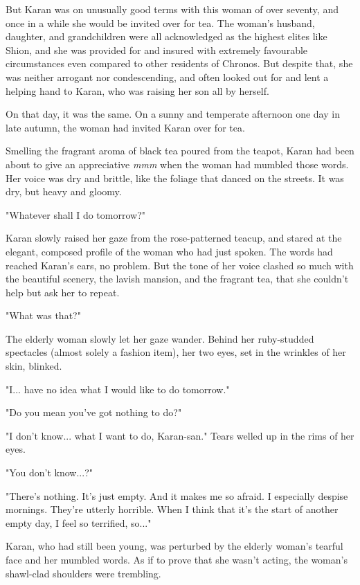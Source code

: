But Karan was on unusually good terms with this woman of over seventy,
and once in a while she would be invited over for tea. The woman's
husband, daughter, and grandchildren were all acknowledged as the
highest elites like Shion, and she was provided for and insured with
extremely favourable circumstances even compared to other residents of
Chronos. But despite that, she was neither arrogant nor condescending,
and often looked out for and lent a helping hand to Karan, who was
raising her son all by herself.

On that day, it was the same. On a sunny and temperate afternoon one day
in late autumn, the woman had invited Karan over for tea.

Smelling the fragrant aroma of black tea poured from the teapot, Karan
had been about to give an appreciative \emph{mmm} when the woman had mumbled
those words. Her voice was dry and brittle, like the foliage that danced
on the streets. It was dry, but heavy and gloomy.

"Whatever shall I do tomorrow?"

Karan slowly raised her gaze from the rose-patterned teacup, and stared
at the elegant, composed profile of the woman who had just spoken. The
words had reached Karan's ears, no problem. But the tone of her voice
clashed so much with the beautiful scenery, the lavish mansion, and the
fragrant tea, that she couldn't help but ask her to repeat.

"What was that?"

The elderly woman slowly let her gaze wander. Behind her ruby-studded
spectacles (almost solely a fashion item), her two eyes, set in the
wrinkles of her skin, blinked.

"I... have no idea what I would like to do tomorrow."

"Do you mean you've got nothing to do?"

"I don't know... what I want to do, Karan-san." Tears welled up in the
rims of her eyes.

"You don't know...?"

"There's nothing. It's just empty. And it makes me so afraid. I
especially despise mornings. They're utterly horrible. When I think that
it's the start of another empty day, I feel so terrified, so..."

Karan, who had still been young, was perturbed by the elderly woman's
tearful face and her mumbled words. As if to prove that she wasn't
acting, the woman's shawl-clad shoulders were trembling.

